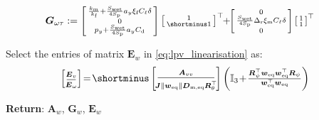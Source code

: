 \begin{algorithm}
\begin{algorithmic}[1]
\begin{align}
{    }  \\
\nonumber
   & \boldsymbol{G}_{\omega \tau} := \smallmat{ \frac{k_{\text{m}}}{k_{\text{f}}} + \frac{S_{\text{wet}}}{4S_{\text{p}}}  a_{y} \xi_{\text{f}} C_{\ell} \delta \\
    0 \\ p_{y}+ \frac{S_{\text{wet}}}{4S_{\text{p}}}  a_{y} C_{\text{d}} }
    \smallmat{ 1 \\ \shortminus  1}^\top 
     \!\! + \!\! 
     \smallmat{ 0 \\ \frac{S_{\text{wet}}}{4S_{\text{p}}} 
     \Delta_{\text{r}} \xi_{\text{m}} C_{\ell}\delta
     \\ 0} \smallmat{ 1 \\ 1}^\top 
\end{align}




\State Select the entries of matrix $\boldsymbol{E}_w$ in \eqref{eq:lpv_linearisation} as:
\begin{align}
\label{eq:Ev_alg2}
\left[  \begin{smallmatrix}
   \! \boldsymbol{E}_{v} \rule[-0.1cm]{0cm}{0.35cm} \! \\ \hline \! \boldsymbol{E}_{\omega} \rule{0cm}{0.25cm} \!
     \end{smallmatrix} \right] \!=\! \shortminus
      \left[ \begin{smallmatrix}
     \boldsymbol{A}_{vv} \rule[-0.1cm]{0cm}{0.35cm}
     \\ \hline 
     \rule{0cm}{0.35cm}
     \!\! \boldsymbol{J} \| \boldsymbol{w}_{\mathrm{eq}} \| \boldsymbol{D}_{\text{m,eq}} \boldsymbol{R}_\theta^\top \!\! 
     \end{smallmatrix} \right]
         \left( \mathbb{I}_3 \!+\! \tfrac{
        \boldsymbol{R}_\psi^\top \boldsymbol{w}_\text{eq} \boldsymbol{w}_\text{eq}^\top \boldsymbol{R}_\psi}{\boldsymbol{w}_\text{eq}^\top \boldsymbol{w}_\text{eq}} \right)
\end{align}



     \end{algorithmic} 
\hspace*{.1cm} \textbf{Return}:  $\boldsymbol{A}_{w}$, $\boldsymbol{G}_{w}$, $\boldsymbol{E}_{w}$ 
 \end{algorithm}

